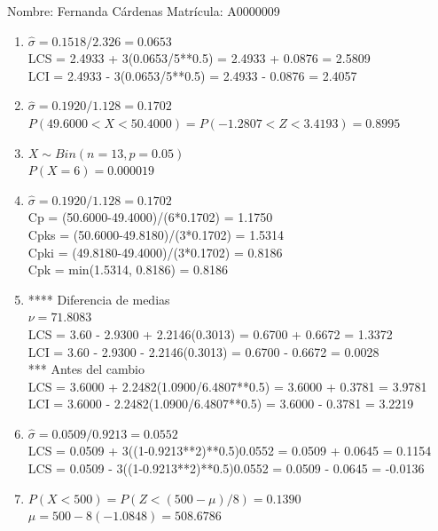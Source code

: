 \documentclass[8pt]{report}
\begin{document}
 \newpage

Nombre: \underline{\hspace*{.2in}}
Fernanda Cárdenas
\underline{\hspace*{.2in}} \quad Matr\'icula:\underline{\hspace*{.2in}}
A0000009
\underline{\hspace*{.2in}} \\

\begin{enumerate}
\item $\hat\sigma = 0.1518/2.326 = 0.0653$\\
LCS = 2.4933 + 3(0.0653/5**0.5) = 2.4933 + 0.0876 = 2.5809\\
LCI = 2.4933 - 3(0.0653/5**0.5) = 2.4933 - 0.0876 = 2.4057
\item $\hat\sigma = 0.1920/1.128 = 0.1702$\\
$P(49.6000 < X < 50.4000) = P(-1.2807 < Z < 3.4193) = 0.8995$\\
\item $X \sim Bin(n=13, p=0.05)$\\
$P(X = 6) = 0.000019$
\item $\hat\sigma = 0.1920/1.128 = 0.1702$\\
Cp = (50.6000-49.4000)/(6*0.1702) = 1.1750\\
Cpks = (50.6000-49.8180)/(3*0.1702) = 1.5314\\
Cpki = (49.8180-49.4000)/(3*0.1702) = 0.8186\\
Cpk = min(1.5314, 0.8186) = 0.8186
\item **** Diferencia de medias\\
$\nu = 71.8083$\\
LCS = 3.60 - 2.9300 + 2.2146(0.3013) = 0.6700 + 0.6672 = 1.3372\\
LCI = 3.60 - 2.9300 - 2.2146(0.3013) = 0.6700 - 0.6672 = 0.0028\\
*** Antes del cambio\\
LCS = 3.6000 + 2.2482(1.0900/6.4807**0.5) = 3.6000 + 0.3781 = 3.9781\\
LCI = 3.6000 - 2.2482(1.0900/6.4807**0.5) = 3.6000 - 0.3781 = 3.2219\\
\item $\hat\sigma = 0.0509/0.9213 = 0.0552$\\
LCS = 0.0509 + 3((1-0.9213**2)**0.5)0.0552 = 0.0509 + 0.0645 = 0.1154\\
LCS = 0.0509 - 3((1-0.9213**2)**0.5)0.0552 = 0.0509 - 0.0645 = -0.0136
\item $P(X < 500) = P(Z < (500-\mu)/8) = 0.1390$\\
$\mu = 500 - 8(-1.0848) = 508.6786$\\
\end{enumerate}
\end{document}

